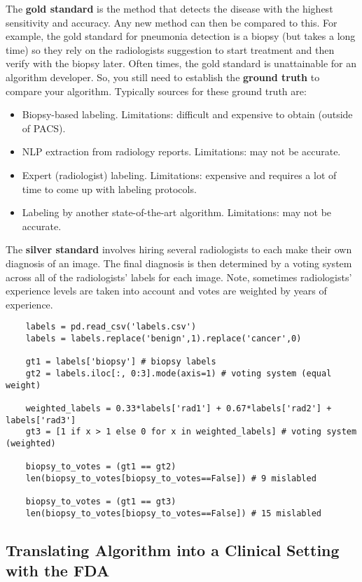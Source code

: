 \documentclass[11pt, a4paper]{article}
\begin{document}
	\noindent The \textbf{gold standard} is the method that detects the disease with the highest sensitivity and accuracy. Any new method can then be compared to this. For example, the gold standard for pneumonia detection is a biopsy (but takes a long time) so they rely on the radiologists suggestion to start treatment and then verify with the biopsy later. Often times, the gold standard is unattainable for an algorithm developer. So, you still need to establish the \textbf{ground truth} to compare your algorithm. Typically sources for these ground truth are:
	\begin{itemize}
		\item Biopsy-based labeling. Limitations: difficult and expensive to obtain (outside of PACS).
		\item NLP extraction from radiology reports. Limitations: may not be accurate.
		\item Expert (radiologist) labeling. Limitations: expensive and requires a lot of time to come up with labeling protocols.
		\item Labeling by another state-of-the-art algorithm. Limitations: may not be accurate.
	\end{itemize}
	The \textbf{silver standard} involves hiring several radiologists to each make their own diagnosis of an image. The final diagnosis is then determined by a voting system across all of the radiologists' labels for each image. Note, sometimes radiologists' experience levels are taken into account and votes are weighted by years of experience. \vspace*{1mm}
	\begin{lstlisting}
	labels = pd.read_csv('labels.csv')
	labels = labels.replace('benign',1).replace('cancer',0)
	
	gt1 = labels['biopsy'] # biopsy labels
	gt2 = labels.iloc[:, 0:3].mode(axis=1) # voting system (equal weight)
	
	weighted_labels = 0.33*labels['rad1'] + 0.67*labels['rad2'] + labels['rad3']
	gt3 = [1 if x > 1 else 0 for x in weighted_labels] # voting system (weighted)
	
	biopsy_to_votes = (gt1 == gt2)
	len(biopsy_to_votes[biopsy_to_votes==False]) # 9 mislabled
	
	biopsy_to_votes = (gt1 == gt3)
	len(biopsy_to_votes[biopsy_to_votes==False]) # 15 mislabled	\end{lstlisting} \vspace*{1mm}
	
	\subsection{Translating Algorithm into a Clinical Setting with the FDA}
	
	
	
	
	
	
	
\end{document}
